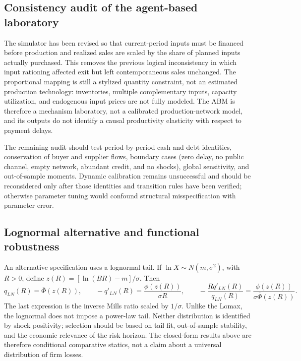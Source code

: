 \documentclass[11pt,a4paper]{article}
\begin{document}
\subsection{Consistency audit of the agent-based laboratory}
The simulator has been revised so that current-period inputs must be financed before production and realized sales are scaled by the share of planned inputs actually purchased. This removes the previous logical inconsistency in which input rationing affected exit but left contemporaneous sales unchanged. The proportional mapping is still a stylized quantity constraint, not an estimated production technology: inventories, multiple complementary inputs, capacity utilization, and endogenous input prices are not fully modeled. The ABM is therefore a mechanism laboratory, not a calibrated production-network model, and its outputs do not identify a causal productivity elasticity with respect to payment delays.

The remaining audit should test period-by-period cash and debt identities, conservation of buyer and supplier flows, boundary cases (zero delay, no public channel, empty network, abundant credit, and no shocks), global sensitivity, and out-of-sample moments. Dynamic calibration remains unsuccessful and should be reconsidered only after those identities and transition rules have been verified; otherwise parameter tuning would confound structural misspecification with parameter error.

\subsection{Lognormal alternative and functional robustness}
An alternative specification uses a lognormal tail. If $\ln X\sim N(m,\sigma^2)$, with $R>0$, define $z(R)=[\ln(BR)-m]/\sigma$. Then
\begin{equation}
q_{LN}(R)=\overline\Phi(z(R)),\qquad -q'_{LN}(R)=\frac{\phi(z(R))}{\sigma R},\qquad -\frac{Rq'_{LN}(R)}{q_{LN}(R)}=\frac{\phi(z(R))}{\sigma\overline\Phi(z(R))}. \label{eq:lognormal}
\end{equation}
The last expression is the inverse Mills ratio scaled by $1/\sigma$. Unlike the Lomax, the lognormal does not impose a power-law tail. Neither distribution is identified by shock positivity; selection should be based on tail fit, out-of-sample stability, and the economic relevance of the risk horizon. The closed-form results above are therefore conditional comparative statics, not a claim about a universal distribution of firm losses.
\end{document}

